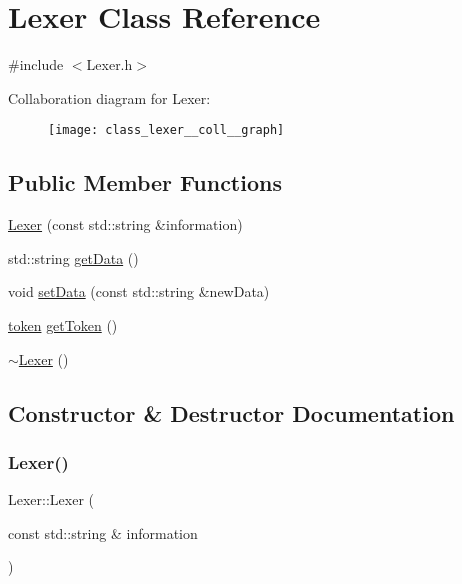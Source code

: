 \hypertarget{class_lexer}{}\section{Lexer Class Reference}
\label{class_lexer}


{\ttfamily \#include $<$Lexer.\+h$>$}



Collaboration diagram for Lexer\+:
\nopagebreak
\begin{figure}[H]
\begin{center}
\leavevmode
\texttt{[image: class\_lexer\_\_coll\_\_graph]}
\end{center}
\end{figure}
\subsection*{Public Member Functions}
\begin{DoxyCompactItemize}
\item 
\mbox{\hyperlink{class_lexer_a5cfb98bed10053b78a43c8bd491999b0}{Lexer}} (const std\+::string \&information)
\item 
std\+::string \mbox{\hyperlink{class_lexer_a883a5a701c3c4ff9079196a9a4442fab}{get\+Data}} ()
\item 
void \mbox{\hyperlink{class_lexer_a50b447b200b69d2bd17b5971f570ed62}{set\+Data}} (const std\+::string \&new\+Data)
\item 
\mbox{\hyperlink{structtoken}{token}} \mbox{\hyperlink{class_lexer_a093f31cf4aa906855b9ece4720d616e0}{get\+Token}} ()
\item 
\mbox{\hyperlink{class_lexer_ad26a84af23d8d303723e36e83fc4e556}{$\sim$\+Lexer}} ()
\end{DoxyCompactItemize}


\subsection{Constructor \& Destructor Documentation}
\mbox{\label{class_lexer_a5cfb98bed10053b78a43c8bd491999b0}} 
\subsubsection{\texorpdfstring{Lexer()}{Lexer()}}
{\footnotesize\ttfamily Lexer\+::\+Lexer (\begin{DoxyParamCaption}\item[{const std\+::string \&}]{information }\end{DoxyParamCaption})}

